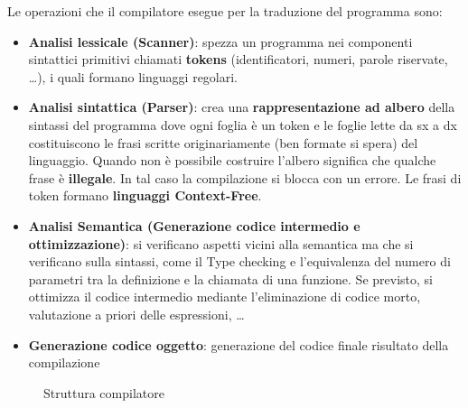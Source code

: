 \documentclass[12pt,a4paper]{article}
\begin{document}
Le operazioni che il compilatore esegue per la traduzione del programma sono:
\begin{itemize}
\item \textbf{Analisi lessicale (Scanner)}: spezza un programma nei componenti sintattici primitivi chiamati \textbf{tokens} (identificatori, numeri, parole riservate, \ldots), i quali formano linguaggi regolari.
\item \textbf{Analisi sintattica (Parser)}: crea una \textbf{rappresentazione ad albero} della sintassi del programma dove ogni foglia è un token e le foglie lette da sx a dx costituiscono le frasi scritte originariamente (ben formate si spera) del linguaggio. Quando non è possibile costruire l'albero significa che qualche frase è \textbf{illegale}. In tal caso la compilazione si blocca con un errore. Le frasi di token formano \textbf{linguaggi Context-Free}.
\item \textbf{Analisi Semantica (Generazione codice intermedio e ottimizzazione)}: si verificano aspetti vicini alla semantica ma che si verificano sulla sintassi, come il Type checking e  l'equivalenza del numero di parametri tra la definizione e la chiamata di una funzione. Se previsto, si ottimizza il codice intermedio mediante l'eliminazione di codice morto, valutazione a priori delle espressioni, \ldots
\item \textbf{Generazione codice oggetto}: generazione del codice finale risultato della compilazione
\end{itemize}

\begin{figure}[h!]
	\begin{center}
	  \caption{Struttura compilatore}
	\end{center}
\end{figure}
\end{document}
